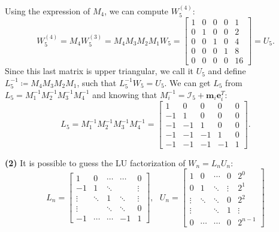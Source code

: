 \documentclass[a4paper,11pt]{article}
\begin{document}
\noindent Using the expression of $M_4$, we can compute $W_5^{(4)}$:
\begin{equation}\label{key}
	W_5^{(4)} = M_4 W_5^{(3)} = M_4 M_3 M_2 M_1 W_5 =
	\begin{bmatrix}
		1 & 0  & 0  & 0  & 1 \\
		0 & 1 & 0 & 0 & 2 \\
		0 & 0 & 1 & 0 & 4 \\
		0 & 0 & 0 & 1 & 8 \\
		0 & 0 & 0 & 0 & 16 
	\end{bmatrix} = U_5.
\end{equation}
Since this last matrix is upper triangular, we call it $U_{5}$ and define $L^{-1}_{5} \coloneqq M_4 M_3 M_2 M_1$, such that $L^{-1}_{5}W_{5}= U_{5}$. We can get $L_5$ from $L_5 = M_1^{-1} M_2^{-1} M_3^{-1} M_4^{-1}$ and knowing that $M_i^{-1} = \mathcal{I}_5 + \textbf{m}_i \textbf{e}_i^T$:
\begin{equation}\label{key}
	L_5 = M_1^{-1} M_2^{-1} M_3^{-1} M_4^{-1} = 
	\begin{bmatrix}
		1 & 0  & 0  & 0  & 0  \\
		-1 & 1 & 0 & 0 & 0 \\
		-1 & -1 & 1 & 0 & 0 \\
		-1 & -1 & -1 & 1 & 0 \\
		-1 & -1 & -1 & -1 & 1 
	\end{bmatrix}.
\end{equation}

\noindent \textbf{(2)} It is possible to guess the LU factorization of $W_n = L_n U_n$:
\begin{equation}\label{key}
	L_n =
	\begin{bmatrix}
		1 & 0  & \cdots  & \cdots  & 0 \\
		-1 & 1 & \ddots & \  & \vdots \\
		\vdots & \ddots & 1 & \ddots & \vdots \\
		\vdots & \  & \ddots & \ddots & 0 \\
		-1 & \cdots & \cdots & -1 & 1 
	\end{bmatrix},\ \ \ 
	U_n = 
	\begin{bmatrix}
		1 & 0  & \cdots  & 0  & 2^0 \\
		0& 1 & \ddots & \vdots & 2^1 \\
		\vdots & \ddots & \ddots & 0 & 2^2 \\
		\vdots & \  & \ddots & 1 & \vdots \\
		0 & \cdots & \cdots & 0 & 2^{n-1}
	\end{bmatrix}
\end{equation}
\end{document}

